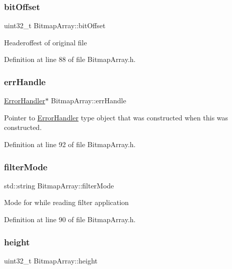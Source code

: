 \subsubsection{\texorpdfstring{bitOffset}{bitOffset}}
{\footnotesize\ttfamily uint32\+\_\+t Bitmap\+Array\+::bit\+Offset\hspace{0.3cm}{\ttfamily [private]}}

Headeroffest of original file 

Definition at line 88 of file Bitmap\+Array.\+h.

\mbox{\label{classBitmapArray_a8d95e8cb2bf8c0f618465a389e8ffe4d}} 
\subsubsection{\texorpdfstring{errHandle}{errHandle}}
{\footnotesize\ttfamily \mbox{\hyperlink{classErrorHandler}{Error\+Handler}}$\ast$ Bitmap\+Array\+::err\+Handle\hspace{0.3cm}{\ttfamily [private]}}

Pointer to \mbox{\hyperlink{classErrorHandler}{Error\+Handler}} type object that was constructed when this was constructed. 

Definition at line 92 of file Bitmap\+Array.\+h.

\mbox{\label{classBitmapArray_adfd3e5a1eed42e37b22a4f2f2560ad67}} 
\subsubsection{\texorpdfstring{filterMode}{filterMode}}
{\footnotesize\ttfamily std\+::string Bitmap\+Array\+::filter\+Mode\hspace{0.3cm}{\ttfamily [private]}}

Mode for while reading filter application 

Definition at line 90 of file Bitmap\+Array.\+h.

\mbox{\label{classBitmapArray_adb8d1a8fcc55c3884ad3eea71c6042be}} 
\subsubsection{\texorpdfstring{height}{height}}
{\footnotesize\ttfamily uint32\+\_\+t Bitmap\+Array\+::height\hspace{0.3cm}{\ttfamily [private]}}

